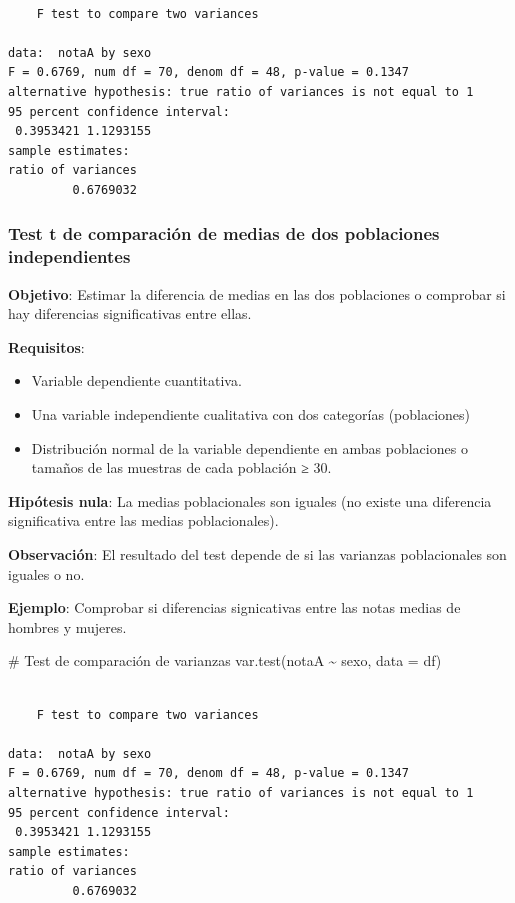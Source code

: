 \documentclass[
  a4paper,
]{scrreport}
\newenvironment{Shaded}{\begin{snugshade}}{\end{snugshade}}
\newcommand{\AttributeTok}[1]{\textcolor[rgb]{0.40,0.45,0.13}{#1}}
\newcommand{\CommentTok}[1]{\textcolor[rgb]{0.37,0.37,0.37}{#1}}
\newcommand{\FunctionTok}[1]{\textcolor[rgb]{0.28,0.35,0.67}{#1}}
\newcommand{\NormalTok}[1]{\textcolor[rgb]{0.00,0.23,0.31}{#1}}
\newcommand{\SpecialCharTok}[1]{\textcolor[rgb]{0.37,0.37,0.37}{#1}}
\providecommand{\tightlist}{%
  \setlength{\itemsep}{0pt}\setlength{\parskip}{0pt}}\usepackage{longtable,booktabs,array}
\theoremstyle{definition}
\theoremstyle{definition}
\theoremstyle{remark}
\begin{document}
\begin{verbatim}

    F test to compare two variances

data:  notaA by sexo
F = 0.6769, num df = 70, denom df = 48, p-value = 0.1347
alternative hypothesis: true ratio of variances is not equal to 1
95 percent confidence interval:
 0.3953421 1.1293155
sample estimates:
ratio of variances 
         0.6769032 
\end{verbatim}

\subsubsection{Test t de comparación de medias de dos poblaciones
independientes}\label{test-t-de-comparaciuxf3n-de-medias-de-dos-poblaciones-independientes}

\textbf{Objetivo}: Estimar la diferencia de medias en las dos
poblaciones o comprobar si hay diferencias significativas entre ellas.

\textbf{Requisitos}:

\begin{itemize}
\tightlist
\item
  Variable dependiente cuantitativa.
\item
  Una variable independiente cualitativa con dos categorías
  (poblaciones)
\item
  Distribución normal de la variable dependiente en ambas poblaciones o
  tamaños de las muestras de cada población ≥ 30.
\end{itemize}

\textbf{Hipótesis nula}: La medias poblacionales son iguales (no existe
una diferencia significativa entre las medias poblacionales).

\textbf{Observación}: El resultado del test depende de si las varianzas
poblacionales son iguales o no.

\textbf{Ejemplo}: Comprobar si diferencias signicativas entre las notas
medias de hombres y mujeres.

\begin{Shaded}
\begin{Highlighting}[]
\CommentTok{\# Test de comparación de varianzas}
\FunctionTok{var.test}\NormalTok{(notaA }\SpecialCharTok{\textasciitilde{}}\NormalTok{ sexo, }\AttributeTok{data =}\NormalTok{ df)}
\end{Highlighting}
\end{Shaded}

\begin{verbatim}

    F test to compare two variances

data:  notaA by sexo
F = 0.6769, num df = 70, denom df = 48, p-value = 0.1347
alternative hypothesis: true ratio of variances is not equal to 1
95 percent confidence interval:
 0.3953421 1.1293155
sample estimates:
ratio of variances 
         0.6769032 
\end{verbatim}
\end{document}
